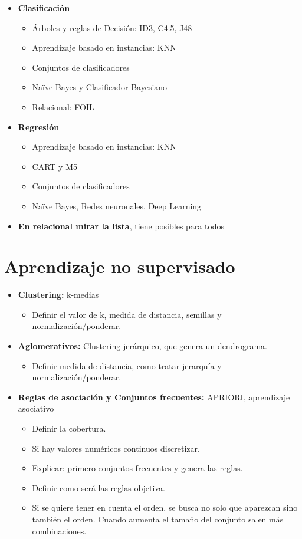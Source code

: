 \documentclass[12pt, twoside, openright]{report} %
\begin{document}
\begin{itemize}
	\item \textbf{Clasificación}
	      \begin{itemize}
		      \item Árboles y reglas de Decisión: ID3, C4.5, J48
		      \item Aprendizaje basado en instancias: KNN
		      \item Conjuntos de clasificadores
		      \item Naïve Bayes y Clasificador Bayesiano
		      \item Relacional: FOIL
	      \end{itemize}
	\item \textbf{Regresión}
	      \begin{itemize}
		      \item Aprendizaje basado en instancias: KNN
		      \item CART y M5
		      \item Conjuntos de clasificadores
		      \item Naïve Bayes, Redes neuronales, Deep Learning
	      \end{itemize}
	\item \textbf{En relacional mirar la lista}, tiene posibles para todos
\end{itemize}

\section{Aprendizaje no supervisado}
\begin{itemize}
	\item \textbf{Clustering:} k-medias
	      \begin{itemize}
		      \item Definir el valor de k, medida de distancia, semillas y normalización/ponderar.
	      \end{itemize}
	\item \textbf{Aglomerativos:} Clustering jerárquico, que genera un dendrograma.
	      \begin{itemize}
		      \item Definir medida de distancia, como tratar jerarquía y normalización/ponderar.
	      \end{itemize}
	\item \textbf{Reglas de asociación y Conjuntos frecuentes:} APRIORI, aprendizaje asociativo
	      \begin{itemize}
		      \item Definir la cobertura.
		      \item Si hay valores numéricos continuos discretizar.
		      \item Explicar: primero conjuntos frecuentes y genera las reglas.
		      \item Definir como será las reglas objetiva.
		      \item Si se quiere tener en cuenta el orden, se busca no solo que aparezcan sino también el orden. Cuando aumenta el tamaño del conjunto salen más combinaciones.
	      \end{itemize}
\end{itemize}
\end{document}
